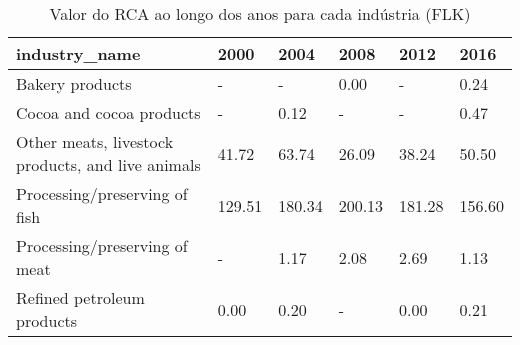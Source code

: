 \begin{table}
\centering
\caption{Valor do RCA ao longo dos anos para cada indústria (FLK)}
\begin{tabular}{p{6cm}p{1.5cm}p{1.5cm}p{1.5cm}p{1.5cm}p{1.5cm}}
\toprule
                                    industry\_name &   2000 &   2004 &   2008 &   2012 &   2016 \\
\midrule
                                  Bakery products &      - &      - &   0.00 &      - &   0.24 \\
                         Cocoa and cocoa products &      - &   0.12 &      - &      - &   0.47 \\
Other meats, livestock products, and live animals &  41.72 &  63.74 &  26.09 &  38.24 &  50.50 \\
                    Processing/preserving of fish & 129.51 & 180.34 & 200.13 & 181.28 & 156.60 \\
                    Processing/preserving of meat &      - &   1.17 &   2.08 &   2.69 &   1.13 \\
                       Refined petroleum products &   0.00 &   0.20 &      - &   0.00 &   0.21 \\
\bottomrule
\end{tabular}
\end{table}
